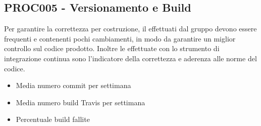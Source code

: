 \documentclass[PianoDiQualifica.tex]{subfiles}
\begin{document}
\subsection{PROC005 - Versionamento e Build}
Per garantire la correttezza per costruzione, il  effettuati dal gruppo devono essere frequenti e contenenti pochi cambiamenti, in modo da garantire un miglior controllo sul codice prodotto. Inoltre le  effettuate con lo strumento di integrazione continua  sono l'indicatore della correttezza e aderenza alle norme del codice.
\begin{itemize}
	\item {} Media numero commit per settimana
	\item {} Media numero build Travis per settimana
	\item {} Percentuale build fallite
\end{itemize}
\end{document}
